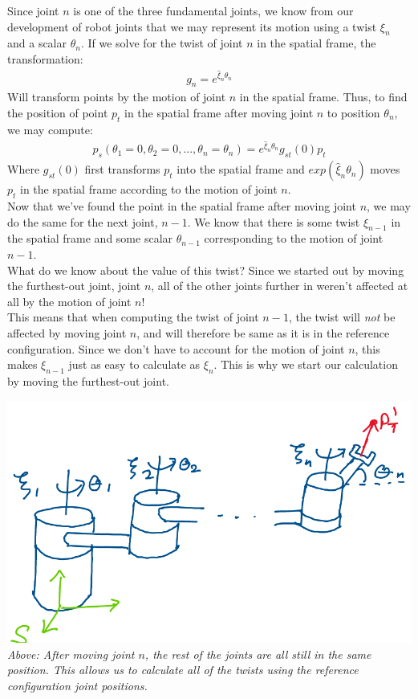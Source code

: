 \documentclass[oneside]{book}
\begin{document}
Since joint $n$ is one of the three fundamental joints, we know from our development of robot joints that we may represent its motion using a twist $\xi_n$ and a scalar $\theta_n$. If we solve for the twist of joint $n$ in the spatial frame, the transformation:
\begin{align}
    g_n = e^{\hat\xi_n\theta_n}
\end{align}
Will transform points by the motion of joint $n$ in the spatial frame. Thus, to find the position of point $p_t$ in the spatial frame after moving joint $n$ to position $\theta_n$, we may compute:
\begin{align}
    p_s(\theta_1 = 0, \theta_2 = 0, ..., \theta_n = \theta_n) = e^{\hat\xi_n\theta_n}g_{st}(0) p_t
\end{align}
Where $g_{st}(0)$ first transforms $p_t$ into the spatial frame and $exp(\hat\xi_n\theta_n)$ moves $p_t$ in the spatial frame according to the motion of joint $n$.\\
Now that we've found the point in the spatial frame after moving joint $n$, we may do the same for the next joint, $n-1$. We know that there is some twist $\xi_{n-1}$ in the spatial frame and some scalar $\theta_{n-1}$ corresponding to the motion of joint $n-1$. \\
What do we know about the value of this twist? Since we started out by moving the furthest-out joint, joint $n$, all of the other joints further in weren't affected at all by the motion of joint $n$! \\
This means that when computing the twist of joint $n-1$, the twist will \textit{not} be affected by moving joint $n$, and will therefore be same as it is in the reference configuration. Since we don't have to account for the motion of joint $n$, this makes $\xi_{n-1}$ just as easy to calculate as $\xi_n$. This is why we start our calculation by moving the furthest-out joint.
\begin{center}
    \includegraphics[scale=0.3]{images/firstTransf.png}\\
    \textit{Above: After moving joint $n$, the rest of the joints are all still in the same position. This allows us to calculate all of the twists using the reference configuration joint positions.}
\end{center}
\end{document}
